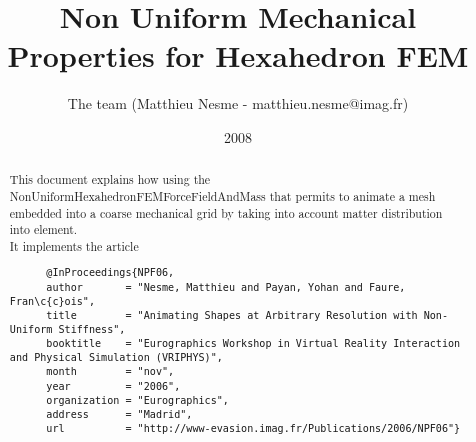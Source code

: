 \documentclass[a4paper,11pt]{article}
\title{Non Uniform Mechanical Properties for Hexahedron FEM}
\author{The \sofa{} team (Matthieu Nesme - matthieu.nesme@imag.fr)}
\date{2008}
\begin{document}
 
\maketitle

\begin{abstract}
This document explains how using the NonUniformHexahedronFEMForceFieldAndMass that permits to animate a mesh embedded into a coarse mechanical grid by taking into account matter distribution into element.
\\It implements the article

\begin{verbatim}
      @InProceedings{NPF06,
      author       = "Nesme, Matthieu and Payan, Yohan and Faure, Fran\c{c}ois",
      title        = "Animating Shapes at Arbitrary Resolution with Non-Uniform Stiffness",
      booktitle    = "Eurographics Workshop in Virtual Reality Interaction and Physical Simulation (VRIPHYS)",
      month        = "nov",
      year         = "2006",
      organization = "Eurographics",
      address      = "Madrid",
      url          = "http://www-evasion.imag.fr/Publications/2006/NPF06"}
 \end{verbatim}
 
\end{abstract}

\tableofcontents
\newpage

\end{document}
